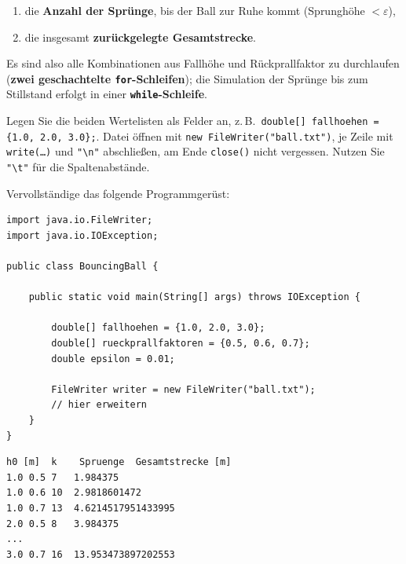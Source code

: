 \documentclass[
	fontsize=12pt,          %
	paper=a4,               %
	numbers=noenddot,       %
	listof=totoc,           %
	listof=entryprefix,     %
	listof=nochaptergap,    %
	bibliography=totoc,     %
	parskip=half            %
	openany                 %
]{scrbook}
\begin{document}
\begin{enumerate}[label=\textbf{\arabic*.)}]
	\item die \textbf{Anzahl der Sprünge}, bis der Ball zur Ruhe kommt (Sprunghöhe $< \varepsilon$),
	\item die insgesamt \textbf{zurückgelegte Gesamtstrecke}.
\end{enumerate}

Es sind also alle Kombinationen aus Fallhöhe und Rückprallfaktor zu durchlaufen (\textbf{zwei geschachtelte \texttt{for}-Schleifen}); die Simulation der Sprünge bis zum Stillstand erfolgt in einer \textbf{\texttt{while}-Schleife}.

\begin{hinweis}
	Legen Sie die beiden Wertelisten als Felder an, z.\,B.\ \lstinline|double[] fallhoehen = {1.0, 2.0, 3.0};|.
	Datei öffnen mit \lstinline|new FileWriter("ball.txt")|, je Zeile mit \texttt{write(\dots)} und \lstinline|"\n"| abschließen, am Ende \texttt{close()} nicht vergessen.
	Nutzen Sie \lstinline|"\t"| für die Spaltenabstände.
\end{hinweis}

\medskip
Vervollständige das folgende Programmgerüst:

\begin{lstlisting}
import java.io.FileWriter;
import java.io.IOException;

public class BouncingBall {

    public static void main(String[] args) throws IOException {

        double[] fallhoehen = {1.0, 2.0, 3.0};
        double[] rueckprallfaktoren = {0.5, 0.6, 0.7};
        double epsilon = 0.01;

        FileWriter writer = new FileWriter("ball.txt");
        // hier erweitern
    }
}
\end{lstlisting}

\begin{beispiel}
\begin{lstlisting}[language={}]
h0 [m]  k    Spruenge  Gesamtstrecke [m]
1.0	0.5	7	1.984375
1.0	0.6	10	2.9818601472
1.0	0.7	13	4.6214517951433995
2.0	0.5	8	3.984375
...
3.0	0.7	16	13.953473897202553
\end{lstlisting}
\end{beispiel}
\end{document}
